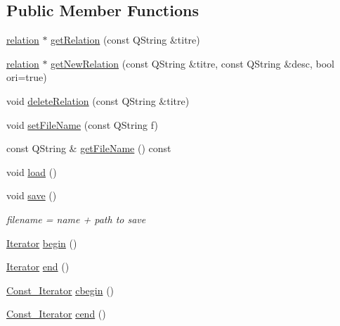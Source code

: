 \subsection*{Public Member Functions}
\begin{DoxyCompactItemize}
\item 
\hyperlink{classrelation}{relation} $\ast$ \hyperlink{classRelationsManager_ab684cb7499142d2bb4f5e0cfd272b5c2}{get\+Relation} (const Q\+String \&titre)
\item 
\hyperlink{classrelation}{relation} $\ast$ \hyperlink{classRelationsManager_af3e0dc9784b5b5727742a0ae89f5a209}{get\+New\+Relation} (const Q\+String \&titre, const Q\+String \&desc, bool ori=true)
\item 
void \hyperlink{classRelationsManager_ad5be054fd05622ef1f34f0d49f75bc3d}{delete\+Relation} (const Q\+String \&titre)
\item 
void \hyperlink{classRelationsManager_aba5ffc848cd2fbf1de82bdf1ff62e357}{set\+File\+Name} (const Q\+String f)
\item 
const Q\+String \& \hyperlink{classRelationsManager_a10c5fb78fcb9b509ec0a03ee7571096f}{get\+File\+Name} () const 
\item 
void \hyperlink{classRelationsManager_a6190c96cadd6b056cf94bfb75b5d56d1}{load} ()
\item 
void \hyperlink{classRelationsManager_a843c8c1e022ce80707c7f535f93ded4d}{save} ()
\begin{DoxyCompactList}\small\item\em filename = name + path to save \end{DoxyCompactList}\item 
\hyperlink{classRelationsManager_1_1Iterator}{Iterator} \hyperlink{classRelationsManager_ad0f3dc04d7833a7b616641bccb0ac1f7}{begin} ()
\item 
\hyperlink{classRelationsManager_1_1Iterator}{Iterator} \hyperlink{classRelationsManager_ab4cb46a1a083852d84617832ebf5327c}{end} ()
\item 
\hyperlink{classRelationsManager_1_1Const__Iterator}{Const\+\_\+\+Iterator} \hyperlink{classRelationsManager_ae9c490bf0c9c21f324144638f87e8528}{cbegin} ()
\item 
\hyperlink{classRelationsManager_1_1Const__Iterator}{Const\+\_\+\+Iterator} \hyperlink{classRelationsManager_a727a9acd8a3b322fc198a61eac7dce5b}{cend} ()
\end{DoxyCompactItemize}
